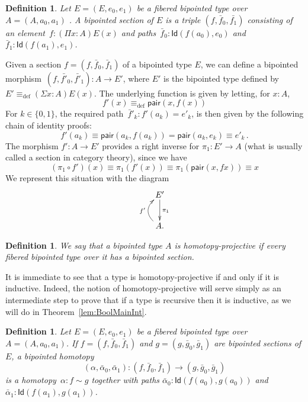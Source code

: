 \documentclass[reqno,10pt,a4paper,oneside]{amsart}
\numberwithin{equation}{section}
\theoremstyle{mythm}
\theoremstyle{mydef}
\newtheorem{definition}[theorem]{Definition}
\theoremstyle{myrmk}
\newcommand{\ie}{\text{i.e.\ }}
\newcommand{\deq}{\equiv}
\newcommand{\defeq}{\deq_{\mathrm{def}}}
\newcommand{\co}{\colon}
\newcommand{\pair}{\mathsf{pair}}
\newcommand{\Id}{\mathsf{Id}}
\begin{document}
\begin{definition} \label{def:fibsection} Let $E = (E, e_0, e_1)$ be a fibered bipointed type over~$A = (A, a_0, a_1)$ . 
A \emph{bipointed section} of $E$ is a triple $(f, \bar{f}_0, \bar{f_1})$ 
consisting of an element~$f \co (\Pi x \co A) E(x)$ and paths~$\bar{f}_0 \co \Id(f(a_0), e_0)$ and $\bar{f}_1 \co \Id(f(a_1), e_1)$. 
\end{definition} 

Given a section $f = (f, \bar{f}_0, \bar{f}_1)$ of a bipointed type $E$, we can define a bipointed morphism~$(f, \bar{f'}_0, \bar{f'}_1) \co A \to E'$, where $E'$ is the
bipointed type defined by $E' \defeq (\Sigma x :A) E(x)$.
The underlying function is given by letting,  for $x : A$, 
\[
f'(x) \defeq \pair(x, f(x))
\]
For $k \in \{ 0, 1 \}$, the required path~$\bar{f}'_k \co f'(a_k) = e'_k$,
is then given by the following chain of identity proofs:
\[
f'(a_k) \deq \pair(a_k, f(a_k)) =  \pair(a_k, e_k) \deq e'_k \, .
\]
The morphism $f' \co A \to E'$ provides a right inverse for $\pi_1 \co E' \to A$ (\ie what is usually called a section in 
category theory), since we have
\[
 (\pi_1 \circ f')(x) \deq \pi_1 (f'(x)) \deq \pi_1 (\pair(x, f x)) \deq x 
\]
 We represent this situation with the diagram
\[
\xymatrix{
E' \ar[d]^{\pi_1} \\
A . \ar@/^1.2pc/[u]^{f'} }
\]

\begin{definition} We say that a bipointed type $A$ is \emph{homotopy-projective} if every fibered bipointed type over it has a bipointed section.
\end{definition} 

It is immediate to see that a type is homotopy-projective if and only if it is inductive. Indeed, the notion of homotopy-projective will serve 
simply as an intermediate step to prove that if a type is recursive then it is inductive, as we will do in Theorem~\ref{lem:BoolMainInt}.



\begin{definition} \label{def:2cellsection} Let $E = (E, e_0, e_1)$ be a fibered bipointed type over $A = (A, a_0, a_1)$. If $f = (f, \bar{f}_0, 
\bar{f}_1)$ and $g = (g, \bar{g}_0, \bar{g}_1)$ are bipointed sections of $E$, a \emph{bipointed homotopy} 
\[
(\alpha, \bar{\alpha}_0, \bar{\alpha}_1) \co (f, \bar{f}_0, \bar{f}_1)  \rightarrow (g, \bar{g}_0, \bar{g}_1)
\] 
is a homotopy~$\alpha \co f \sim g$ together with paths $\bar{\alpha}_0 \co \Id( f(a_0),  g(a_0))$ and $\bar{\alpha}_1 \co \Id ( f(a_1) , g(a_1))$. 
\end{definition} 
\end{document}

